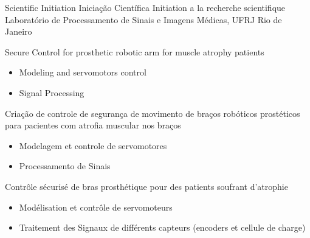 \cventry{\aug\ 2015 \newline \jun\ 2016\newline}
{
  \ml
  {Scientific Initiation}
  {Iniciação Científica}
  {Initiation a la recherche scientifique}}
{\newline Laboratório de Processamento de Sinais e Imagens Médicas, UFRJ}
{\newline Rio de Janeiro}
{\brazil}
{
  \ml
  { Secure Control for prosthetic robotic arm for muscle atrophy
    patients
    \begin{itemize}
      \item Modeling and servomotors control
      \item Signal Processing
    \end{itemize}
  }
  {
    Criação de controle de segurança de movimento de braços robóticos prostéticos para
    pacientes com atrofia muscular nos braços
    \begin{itemize}
      \item Modelagem et controle de servomotores
      \item Processamento de Sinais
    \end{itemize}
  }
  { Contrôle sécurisé de bras prosthétique
    pour des patients soufrant d'atrophie
    \begin{itemize}
      \item Modélisation et contrôle de servomoteurs
      \item Traitement des Signaux de différents capteurs (encoders et cellule de charge)
    \end{itemize}
  }
}

